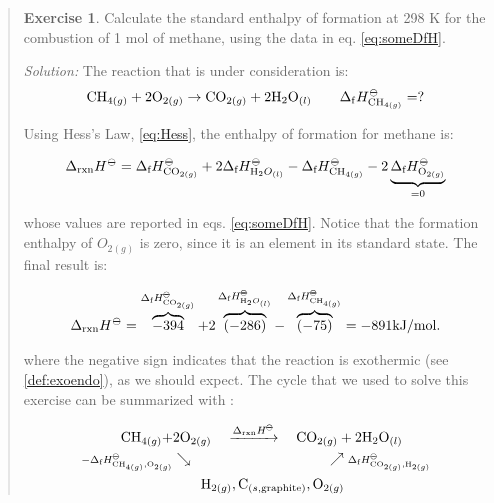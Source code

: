 \documentclass[
  9pt,
]{extbook}
\theoremstyle{definition}
\theoremstyle{definition}
\theoremstyle{definition}
\newtheorem{exercise}{Exercise}[chapter]
\theoremstyle{remark}
\begin{document}
\begin{quote}
\begin{exercise}
\protect\hypertarget{exr:HessLawEx}{}{\label{exr:HessLawEx} }Calculate the standard enthalpy of formation at 298 K for the combustion of 1 mol of methane, using the data in eq. \eqref{eq:someDfH}.

\emph{Solution:} The reaction that is under consideration is:
\begin{equation}
  \mathrm{CH}_{4(g)} + 2 \mathrm{O}_{2(g)} \rightarrow \mathrm{CO}_{2(g)} + 2 \mathrm{H}_2 \mathrm{O}_{(l)} \qquad \Delta_{\mathrm{f}} H_{\mathrm{CH}_{4(g)}}^{-\kern-6pt{\ominus}\kern-6pt-}= ?
\end{equation}

Using Hess's Law, \eqref{eq:Hess}, the enthalpy of formation for methane is:

\begin{equation}
 \Delta_{\text{rxn}} H^{-\kern-6pt{\ominus}\kern-6pt-}=  \Delta_{\text{f}} H^{-\kern-6pt{\ominus}\kern-6pt-}_{\mathrm{CO}_{2(g)}} + 2 \Delta_{\text{f}} H^{-\kern-6pt{\ominus}\kern-6pt-}_{\mathrm{H}_{2}O_{(l)}} - \Delta_{\text{f}} H^{-\kern-6pt{\ominus}\kern-6pt-}_{\mathrm{CH}_{4(g)}} - 2 \underbrace{\Delta_{\text{f}} H^{-\kern-6pt{\ominus}\kern-6pt-}_{\mathrm{O}_{2(g)}}}_{=0}
\end{equation}

whose values are reported in eqs. \eqref{eq:someDfH}. Notice that the formation enthalpy of \(O_{2(g)}\) is zero, since it is an element in its standard state. The final result is:

\begin{equation}
 \Delta_{\text{rxn}} H^{-\kern-6pt{\ominus}\kern-6pt-}=  \overbrace{-394}^{\Delta_{\text{f}} H^{-\kern-6pt{\ominus}\kern-6pt-}_{\mathrm{CO}_{2(g)}}} +2 \overbrace{(-286)}^{\Delta_{\text{f}} H^{-\kern-6pt{\ominus}\kern-6pt-}_{\mathrm{H}_{2}O_{(l)}}} - \overbrace{(-75)}^{\Delta_{\text{f}} H^{-\kern-6pt{\ominus}\kern-6pt-}_{\mathrm{CH}_{4(g)}}}  = -891 \mathrm{kJ/mol}.
\end{equation}

where the negative sign indicates that the reaction is exothermic (see \ref{def:exoendo}), as we should expect. The cycle that we used to solve this exercise can be summarized with :

\begin{equation}
\begin{aligned}
\mathrm{CH}_{4(g)} + & 2 \mathrm{O}_{2(g)} \quad \xrightarrow{\Delta_{\text{rxn}} H^{-\kern-6pt{\ominus}\kern-6pt-}} \quad \mathrm{CO}_{2(g)} + 2 \mathrm{H}_2 \mathrm{O}_{(l)} \\
  \scriptstyle{-\Delta_{\text{f}} H_{\mathrm{CH}_{4(g)},\mathrm{O}_{2(g)}}^{-\kern-6pt{\ominus}\kern-6pt-}} & \searrow \qquad \qquad \qquad \qquad \qquad \nearrow \; \scriptstyle{\Delta_{\text{f}} H_{\text{CO}_{2(g)},\mathrm{H}_{2(g)}}^{-\kern-6pt{\ominus}\kern-6pt-}}\\
  & \qquad \mathrm{H}_{2(g)}, \mathrm{C}_{(s,\text{graphite})}, \mathrm{O}_{2(g)}
\end{aligned}
\end{equation}


\end{exercise}
\end{quote}
\end{document}
